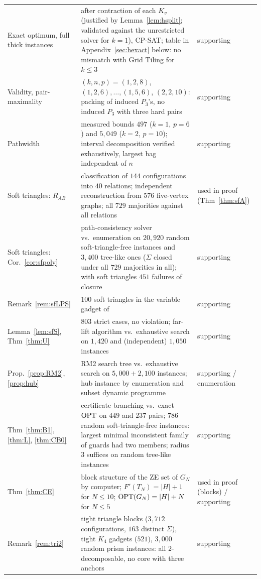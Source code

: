 {\begin{longtable}{@{}>{\raggedright\arraybackslash}p{}>{\raggedright\arraybackslash}p{}>{\raggedright\arraybackslash}p{}@{}}
Exact optimum, full thick instances & after contraction of each $K_v$ (justified by Lemma~\ref{lem:hsplit}; validated against the unrestricted solver for $k=1$), CP-SAT; table in Appendix~\ref{sec:hexact} below: no mismatch with Grid Tiling for $k\le3$ & supporting\\
Validity, pair-maximality & $(k,n,p)=(1,2,8)$, $(1,2,6),\dots,(1,5,6)$, $(2,2,10)$: packing of induced $P_3$'s, no induced $P_3$ with three hard pairs & supporting\\
Pathwidth & measured bounds $497$ ($k=1$, $p=6$) and $5{,}049$ ($k=2$, $p=10$); interval decomposition verified exhaustively, largest bag independent of $n$ & supporting\\
Soft triangles: $R_{AB}$ & classification of $144$ configurations into $40$ relations; independent reconstruction from $576$ five-vertex graphs; all $729$ majorities against all relations & used in proof (Thm~\ref{thm:sfA})\\
Soft triangles: Cor.~\ref{cor:sfpoly} & path-consistency solver vs.\ enumeration on $20{,}920$ random soft-triangle-free instances and $3{,}400$ tree-like ones ($\Sigma$ closed under all $729$ majorities in all); with soft triangles $451$ failures of closure & supporting\\
Remark~\ref{rem:sfLPS} & $100$ soft triangles in the variable gadget of~\cite{LPS23} & supporting\\
Lemma~\ref{lem:sfS}, Thm~\ref{thm:U} & $803$ strict cases, no violation; far-lift algorithm vs.\ exhaustive search on $1{,}420$ and (independent) $1{,}050$ instances & supporting\\
Prop.~\ref{prop:RM2}, \ref{prop:hub} & RM2 search tree vs.\ exhaustive search on $5{,}000+2{,}100$ instances; hub instance by enumeration and subset dynamic programme & supporting / enumeration\\
Thm~\ref{thm:B1}, \ref{thm:L}, \ref{thm:CB0} & certificate branching vs.\ exact $\mathrm{OPT}$ on $449$ and $237$ pairs; $786$ random soft-triangle-free instances: largest minimal inconsistent family of guards had two members; radius $3$ suffices on random tree-like instances & supporting\\
Thm~\ref{thm:CE} & block structure of the ZE set of $G_N$ by computer; $F'(T_N)=|H|+1$ for $N\le10$; $\mathrm{OPT}(G_N)=|H|+N$ for $N\le5$ & used in proof (blocks) / supporting\\
Remark~\ref{rem:tri2} & tight triangle blocks ($3{,}712$ configurations, $163$ distinct $\Sigma$), tight $K_4$ gadgets ($521$), $3{,}000$ random prism instances: all $2$-decomposable, no core with three anchors & supporting\\

\end{longtable}}
